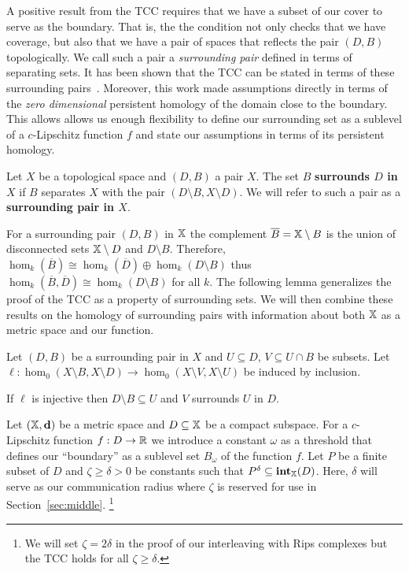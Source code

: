 
A positive result from the TCC requires that we have a subset of our cover to serve as the boundary.
That is, the the condition not only checks that we have coverage, but also that we have a pair of spaces that reflects the pair $(D, B)$ topologically.
We call such a pair a \emph{surrounding pair} defined in terms of separating sets.
It has been shown that the TCC can be stated in terms of these surrounding pairs~\cite{cavanna2017when}.
Moreover, this work made assumptions directly in terms of the \emph{zero dimensional} persistent homology of the domain close to the boundary.
This allows allows us enough flexibility to define our surrounding set as a sublevel of a $c$-Lipschitz function $f$ and state our assumptions in terms of its persistent homology.

\begin{definition}
  Let $X$ be a topological space and $(D,B)$ a pair $X$.
  The set $B$ \textbf{surrounds $D$ in $X$} if $B$ separates $X$ with the pair $(D\setminus B, X\setminus D)$.
  We will refer to such a pair as a \textbf{surrounding pair in $X$}.
\end{definition}

For a surrounding pair $(D,B)$ in $\mathbb{X}$  the complement $\overline{B} = \mathbb{X}\setminus B$ is the union of disconnected sets $\mathbb{X}\setminus D$ and $D\setminus B$.
Therefore, $\hom_k(\overline{B}) \cong \hom_k(\overline{D})\oplus \hom_k(D\setminus B)$ thus $\hom_k(\overline{B},\overline{D})\cong \hom_k(D\setminus B)$ for all $k$.
The following lemma generalizes the proof of the TCC as a property of surrounding sets.%
We will then combine these results on the homology of surrounding pairs with information about both $\mathbb{X}$ as a metric space and our function.

\begin{lemma}\label{lem:coverage}
  Let $(D, B)$ be a surrounding pair in $X$ and $U\subseteq D$, $V\subseteq U\cap B$ be subsets.
  Let $\ell: \hom_0(X\setminus B, X\setminus D)\to \hom_0(X\setminus V, X\setminus U)$ be induced by inclusion.

  If $\ell$ is injective then $D\setminus B\subseteq U$ and $V$ surrounds $U$ in $D$.
\end{lemma}

Let $(\mathbb{X},\mathbf{d})$ be a metric space and $D\subseteq \mathbb{X}$ be a compact subspace.
For a $c$-Lipschitz function $f : D\to \mathbb{R}$ we introduce a constant $\omega$ as a threshold that defines our ``boundary'' as a sublevel set $B_\omega$ of the function $f$.
Let $P$ be a finite subset of $D$ and $\zeta\geq\delta > 0 $ be constants such that $P^\delta\subseteq \mathbf{int}_{\mathbb{X}}(D)$.
Here, $\delta$ will serve as our communication radius where $\zeta$ is reserved for use in Section~\ref{sec:middle}.
  \footnote{We will set $\zeta = 2\delta$ in the proof of our interleaving with Rips complexes but the TCC holds for all $\zeta\geq\delta$.}

